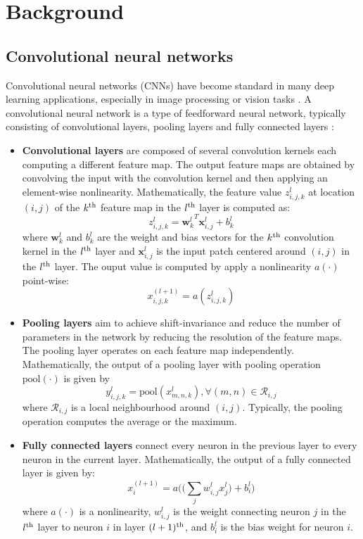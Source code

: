 \documentclass{article}
\begin{document}
\section{Background}
\subsection{Convolutional neural networks}
Convolutional neural networks (CNNs) have become standard in many deep learning applications, especially in image processing or vision tasks \cite{Goodfellow-et-al-2016}. A convolutional neural network is a type of feedforward neural network, typically consisting of convolutional layers, pooling layers and fully connected layers \cite{DBLP:journals/corr/GuWKMSSLWW15}:
\begin{itemize}
	\item \textbf{Convolutional layers} are composed of  several 	convolution kernels each computing a different feature map. The output feature maps are obtained by convolving the input with the convolution kernel and then applying an element-wise nonlinearity. Mathematically, the feature value $z_{i,j,k}^l$ at location $(i,j)$ of the $k\textsuperscript{th}$ feature map in the $l\textsuperscript{th}$ layer is computed as:
	\[z_{i,j,k}^l = {\mathbf{w}_k^l}^T \mathbf{x}_{i,j}^l + b_k^l\]
	where  $\mathbf{w}_k^l$ and $b_k^l$ are the weight and bias vectors for the $k\textsuperscript{th}$ convolution kernel in the $l\textsuperscript{th}$ layer and $\mathbf{x}_{i,j}^l$ is the input patch centered around $(i,j)$ in the $l\textsuperscript{th}$ layer. The ouput value is computed by apply a nonlinearity $a(\cdot)$ point-wise:
	\[x_{i,j,k}^{(l+1)} = a(z_{i,j,k}^l) \]

	\item \textbf{Pooling layers} aim to achieve shift-invariance and reduce the number of parameters in the network by reducing the resolution of the feature maps. The pooling layer operates on each feature map independently. Mathematically, the output of a pooling layer with pooling operation $\textrm{pool}(\cdot)$ is given by 
	\[ y_{i,j,k}^l = \textrm{pool}(x^l_{m,n,k}), \forall (m,n) \in \mathcal{R}_{i,j}\]
	where $\mathcal{R}_{i,j}$ is a local neighbourhood around $(i,j)$. Typically, the pooling operation computes the average or the maximum.
	
	\item \textbf{Fully connected layers} connect every neuron in the previous layer to every neuron in the current layer. Mathematically, the output of a fully connected layer is given by:
	\[ x^{(l+1)}_i = a\Big(\big( \sum_j w_{i,j}^l x^l_j \big) + b^l_i\big)\]
	where $a(\cdot)$ is a nonlinearity, $w_{i,j}^l$ is the weight connecting neuron $j$ in the $l\textsuperscript{th}$ layer to neuron $i$ in layer $(l+1)\textsuperscript{th}$, and $b_i^l$ is the bias weight for neuron $i$.
\end{itemize}
\end{document}
